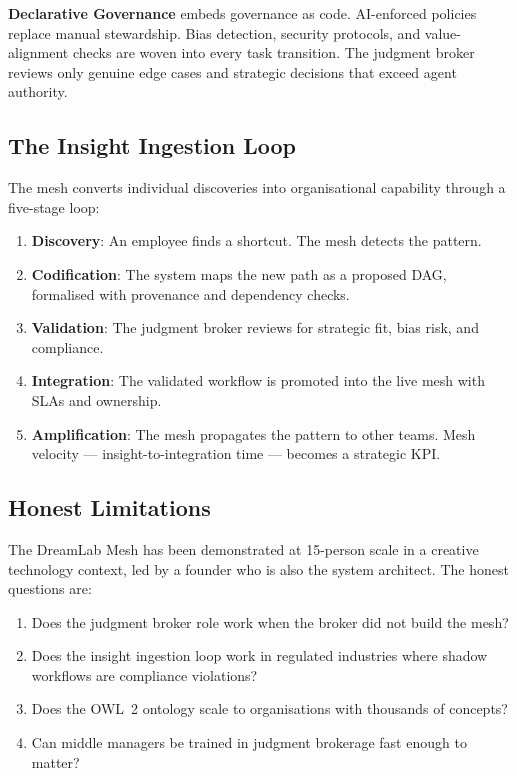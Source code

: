 \textbf{Declarative Governance} embeds governance as code. AI-enforced policies replace manual stewardship. Bias detection, security protocols, and value-alignment checks are woven into every task transition. The judgment broker reviews only genuine edge cases and strategic decisions that exceed agent authority.

\subsection{The Insight Ingestion Loop}

The mesh converts individual discoveries into organisational capability through a five-stage loop:

\begin{enumerate}
  \item \textbf{Discovery}: An employee finds a shortcut. The mesh detects the pattern.
  \item \textbf{Codification}: The system maps the new path as a proposed DAG, formalised with provenance and dependency checks.
  \item \textbf{Validation}: The judgment broker reviews for strategic fit, bias risk, and compliance.
  \item \textbf{Integration}: The validated workflow is promoted into the live mesh with SLAs and ownership.
  \item \textbf{Amplification}: The mesh propagates the pattern to other teams. Mesh velocity --- insight-to-integration time --- becomes a strategic KPI.
\end{enumerate}

\subsection{Honest Limitations}

The DreamLab Mesh has been demonstrated at 15-person scale in a creative technology context, led by a founder who is also the system architect. The honest questions are:

\begin{enumerate}
  \item Does the judgment broker role work when the broker did not build the mesh?
  \item Does the insight ingestion loop work in regulated industries where shadow workflows are compliance violations?
  \item Does the OWL~2 ontology scale to organisations with thousands of concepts?
  \item Can middle managers be trained in judgment brokerage fast enough to matter?
\end{enumerate}

